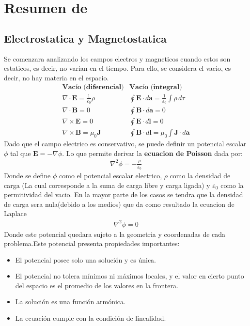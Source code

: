 \usetikzlibrary{patterns}

\section{Resumen de }
\subsection{Electrostatica y Magnetostatica}

Se comenzara analizando los campos electros y magneticos cuando estos son estaticos, es decir, no varian en el tiempo. Para ello, se considera el vacio, es decir, no hay materia en el espacio. 
\begin{equation}
    \begin{array}{c|c}
    \textbf{Vacío (diferencial)} & \textbf{Vacío (integral)} \\[8pt]
    \nabla \cdot \mathbf{E} = \frac{1}{\varepsilon_0} \rho 
    & \oint \mathbf{E} \cdot d\mathbf{a} = \frac{1}{\varepsilon_0} \int \rho \, d\tau \\[5pt]
    \nabla \cdot \mathbf{B} = 0 
    & \oint \mathbf{B} \cdot d\mathbf{a} = 0 \\[5pt]
    \nabla \times \mathbf{E} = 0 
    & \oint \mathbf{E} \cdot d\mathbf{l} = 0 \\[5pt]
    \nabla \times \mathbf{B} = \mu_0 \mathbf{J} 
    & \oint \mathbf{B} \cdot d\mathbf{l} = \mu_0 \int \mathbf{J} \cdot d\mathbf{a}
    \end{array}
\end{equation}
Dado que el campo electrico es conservativo, se puede definir un potencial escalar $\phi$ tal que $\mathbf{E} = -\nabla \phi$. Lo que permite derivar la \textbf{ecuacion de Poisson} dada por:
\begin{align}
    \nabla^2 \phi = -\frac{\rho}{\varepsilon_0}
\end{align}
Donde se define $\phi$ como el potencial escalar electrico, $\rho$ como la densidad de carga (La cual corresponde a la suma de carga libre y carga ligada) y $\varepsilon_0$ como la permitividad del vacio. En la mayor parte de los casos se tendra que la densidad de carga sera nula(debido a los medios) que da como resultado la ecuacion de Laplace
\begin{align}
    \nabla^2 \phi = 0
\end{align}
Donde este potencial quedara sujeto a la geometria y coordenadas de cada problema.Este potencial presenta propiedades importantes:
\begin{itemize}
    \item El potencial posee solo una solución y es única.
    \item El potencial no tolera mínimos ni máximos locales, y el valor en cierto punto del espacio es el promedio de los valores en la frontera.
    \item La solución es una función armónica.
    \item La ecuación cumple con la condición de linealidad.
\end{itemize}
